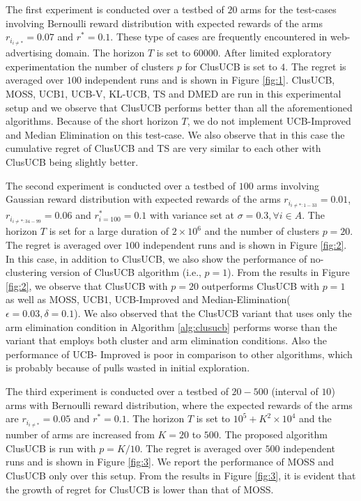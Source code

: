 The first experiment is conducted over a testbed of $20$ arms for the test-cases involving Bernoulli reward distribution with expected rewards of the arms $r_{i_{{i}\neq {*}}}=0.07$ and $r^{*}=0.1$. These type of cases are frequently encountered in web-advertising domain. The horizon $T$ is set to $60000$. After limited exploratory experimentation the number of clusters $p$ for ClusUCB is set to $4$. The regret is averaged over $100$ independent runs and is shown in Figure \ref{fig:1}. 
ClusUCB, MOSS, UCB1, UCB-V, KL-UCB, TS and DMED are run in this experimental setup and we observe that ClusUCB performs better than all the aforementioned algorithms. Because of the short horizon $T$, we do not implement UCB-Improved and Median Elimination on this test-case. We also observe that in this case the cumulative regret of ClusUCB and TS are very similar to each other with ClusUCB being slightly better.

	The second experiment is conducted over a testbed of $100$ arms involving Gaussian reward distribution with expected rewards of the arms $r_{i_{{i}\neq {*}:1-33}}=0.01$, $r_{i_{{i}\neq {*}:34-99}}=0.06$ and $r^{*}_{i=100}=0.1$ with variance set at $\sigma = 0.3,\forall i\in A$. The horizon $T$ is set for a large duration of $2\times 10^{6}$ and the number of clusters $p=20$. The regret is averaged over $100$ independent runs and is shown in Figure \ref{fig:2}. In this case, in addition to ClusUCB, we also show the performance of no-clustering version of ClusUCB algorithm (i.e., $p=1$).   From the results in Figure \ref{fig:2}, we observe that ClusUCB with $p=20$ outperforms ClusUCB with $p=1$ as well as MOSS, UCB1, UCB-Improved and Median-Elimination($\epsilon=0.03,\delta=0.1$). We also observed that the ClusUCB variant that uses only  the arm elimination condition in Algorithm \ref{alg:clusucb} performs worse than the variant that employs both cluster and arm elimination conditions. Also the performance of UCB-
Improved is poor in comparison to other algorithms, which is probably because of pulls wasted in initial exploration.

	The third experiment is conducted over a testbed of $20-500$ (interval of $10$) arms with Bernoulli reward distribution, where the expected rewards of the arms are $r_{i_{{i}\neq {*}}}=0.05$ and $r^{*}=0.1$. The horizon $T$ is set to $10^{5} + K^{2}\times 10^{4}$ and the number of arms are increased from $K=20$ to $500$. The proposed algorithm ClusUCB is run with $p=K/10$. The regret is averaged over $500$ independent runs and is shown in Figure \ref{fig:3}. We report the performance of MOSS and ClusUCB only over this setup. From the results in Figure \ref{fig:3}, it is evident that the growth of regret for ClusUCB is lower than that of MOSS. 

